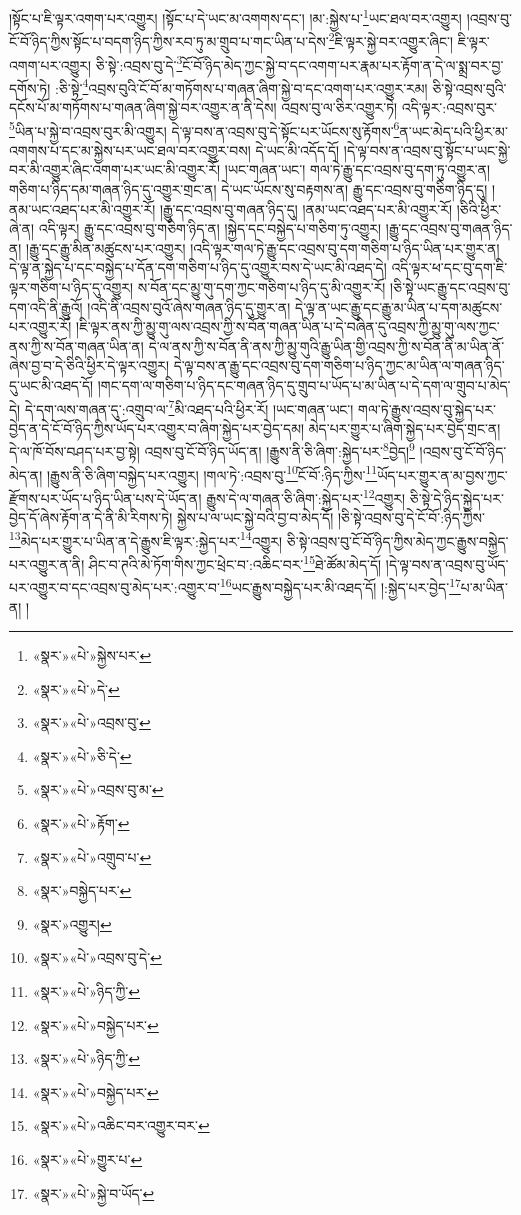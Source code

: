 །སྟོང་པ་ཇི་ལྟར་འགག་པར་འགྱུར། །སྟོང་པ་དེ་ཡང་མ་འགགས་དང་། །མ་:སྐྱེས་པ་\footnote{«སྣར་»«པེ་»སྐྱེས་པར་}ཡང་ཐལ་བར་འགྱུར། །འབྲས་བུ་ངོ་བོ་ཉིད་ཀྱིས་སྟོང་པ་བདག་ཉིད་ཀྱིས་རབ་ཏུ་མ་གྲུབ་པ་གང་ཡིན་པ་དེས་\footnote{«སྣར་»«པེ་»དེ་}ཇི་ལྟར་སྐྱེ་བར་འགྱུར་ཞིང་། ཇི་ལྟར་འགག་པར་འགྱུར། ཅི་སྟེ་:འབྲས་བུ་དེ་\footnote{«སྣར་»«པེ་»འབྲས་བུ་}ངོ་བོ་ཉིད་མེད་ཀྱང་སྐྱེ་བ་དང་འགག་པར་རྣམ་པར་རྟོག་ན་དེ་ལ་སྨྲ་བར་བྱ་དགོས་ཏེ། :ཅི་སྟེ་\footnote{«སྣར་»«པེ་»ཅི་དེ་}འབྲས་བུའི་ངོ་བོ་མ་གཏོགས་པ་གཞན་ཞིག་སྐྱེ་བ་དང་འགག་པར་འགྱུར་རམ། ཅི་སྟེ་འབྲས་བུའི་དངོས་པོ་མ་གཏོགས་པ་གཞན་ཞིག་སྐྱེ་བར་འགྱུར་ན་ནི་དེས། འབྲས་བུ་ལ་ཅིར་འགྱུར་ཏེ། འདི་ལྟར་:འབྲས་བུར་\footnote{«སྣར་»«པེ་»འབྲས་བུ་མ་}ཡིན་པ་སྐྱེ་བ་འབྲས་བུར་མི་འགྱུར། དེ་ལྟ་བས་ན་འབྲས་བུ་དེ་སྟོང་པར་ཡོངས་སུ་རྟོགས་\footnote{«སྣར་»«པེ་»རྟོག་}ན་ཡང་མེད་པའི་ཕྱིར་མ་འགགས་པ་དང་མ་སྐྱེས་པར་ཡང་ཐལ་བར་འགྱུར་བས། དེ་ཡང་མི་འདོད་དོ། །དེ་ལྟ་བས་ན་འབྲས་བུ་སྟོང་པ་ཡང་སྐྱེ་བར་མི་འགྱུར་ཞིང་འགག་པར་ཡང་མི་འགྱུར་རོ། །ཡང་གཞན་ཡང་། གལ་ཏེ་རྒྱུ་དང་འབྲས་བུ་དག་ཏུ་འགྱུར་ན། གཅིག་པ་ཉིད་དམ་གཞན་ཉིད་དུ་འགྱུར་གྲང་ན། དེ་ཡང་ཡོངས་སུ་བརྟགས་ན། རྒྱུ་དང་འབྲས་བུ་གཅིག་ཉིད་དུ། །ནམ་ཡང་འཐད་པར་མི་འགྱུར་རོ། །རྒྱུ་དང་འབྲས་བུ་གཞན་ཉིད་དུ། །ནམ་ཡང་འཐད་པར་མི་འགྱུར་རོ། །ཅིའི་ཕྱིར་ཞེ་ན། འདི་ལྟར། རྒྱུ་དང་འབྲས་བུ་གཅིག་ཉིད་ན། །སྐྱེད་དང་བསྐྱེད་པ་གཅིག་ཏུ་འགྱུར། །རྒྱུ་དང་འབྲས་བུ་གཞན་ཉིད་ན། །རྒྱུ་དང་རྒྱུ་མིན་མཚུངས་པར་འགྱུར། །འདི་ལྟར་གལ་ཏེ་རྒྱུ་དང་འབྲས་བུ་དག་གཅིག་པ་ཉིད་ཡིན་པར་གྱུར་ན། དེ་ལྟ་ན་སྐྱེད་པ་དང་བསྐྱེད་པ་དོན་དག་གཅིག་པ་ཉིད་དུ་འགྱུར་བས་དེ་ཡང་མི་འཐད་དེ། འདི་ལྟར་ཕ་དང་བུ་དག་ཇི་ལྟར་གཅིག་པ་ཉིད་དུ་འགྱུར། ས་བོན་དང་མྱུ་གུ་དག་ཀྱང་གཅིག་པ་ཉིད་དུ་མི་འགྱུར་རོ། །ཅི་སྟེ་ཡང་རྒྱུ་དང་འབྲས་བུ་དག་འདི་ནི་རྒྱུའོ། །འདི་ནི་འབྲས་བུའོ་ཞེས་གཞན་ཉིད་དུ་གྱུར་ན། དེ་ལྟ་ན་ཡང་རྒྱུ་དང་རྒྱུ་མ་ཡིན་པ་དག་མཚུངས་པར་འགྱུར་རོ། །ཇི་ལྟར་ནས་ཀྱི་མྱུ་གུ་ལས་འབྲས་ཀྱི་ས་བོན་གཞན་ཡིན་པ་དེ་བཞིན་དུ་འབྲས་ཀྱི་མྱུ་གུ་ལས་ཀྱང་ནས་ཀྱི་ས་བོན་གཞན་ཡིན་ན། དེ་ལ་ནས་ཀྱི་ས་བོན་ནི་ནས་ཀྱི་མྱུ་གུའི་རྒྱུ་ཡིན་གྱི་འབྲས་ཀྱི་ས་བོན་ནི་མ་ཡིན་ནོ་ཞེས་བྱ་བ་དེ་ཅིའི་ཕྱིར་དེ་ལྟར་འགྱུར། དེ་ལྟ་བས་ན་རྒྱུ་དང་འབྲས་བུ་དག་གཅིག་པ་ཉིད་ཀྱང་མ་ཡིན་ལ་གཞན་ཉིད་དུ་ཡང་མི་འཐད་དོ། །གང་དག་ལ་གཅིག་པ་ཉིད་དང་གཞན་ཉིད་དུ་གྲུབ་པ་ཡོད་པ་མ་ཡིན་པ་དེ་དག་ལ་གྲུབ་པ་མེད་དེ། དེ་དག་ལས་གཞན་དུ་:འགྲུབ་ལ་\footnote{«སྣར་»«པེ་»འགྲུབ་པ་}མི་འཐད་པའི་ཕྱིར་རོ། །ཡང་གཞན་ཡང་། གལ་ཏེ་རྒྱུས་འབྲས་བུ་སྐྱེད་པར་བྱེད་ན་དེ་ངོ་བོ་ཉིད་ཀྱིས་ཡོད་པར་འགྱུར་བ་ཞིག་སྐྱེད་པར་བྱེད་དམ། མེད་པར་གྱུར་པ་ཞིག་སྐྱེད་པར་བྱེད་གྲང་ན། དེ་ལ་ཁོ་བོས་བཤད་པར་བྱ་སྟེ། འབྲས་བུ་ངོ་བོ་ཉིད་ཡོད་ན། །རྒྱུས་ནི་ཅི་ཞིག་:སྐྱེད་པར་\footnote{«སྣར་»བསྐྱེད་པར་}བྱེད།\footnote{«སྣར་»འགྱུར།} །འབྲས་བུ་ངོ་བོ་ཉིད་མེད་ན། །རྒྱུས་ནི་ཅི་ཞིག་བསྐྱེད་པར་འགྱུར། །གལ་ཏེ་:འབྲས་བུ་\footnote{«སྣར་»«པེ་»འབྲས་བུ་དེ་}ངོ་བོ་:ཉིད་ཀྱིས་\footnote{«སྣར་»«པེ་»ཉིད་ཀྱི་}ཡོད་པར་གྱུར་ན་མ་བྱས་ཀྱང་རྫོགས་པར་ཡོད་པ་ཉིད་ཡིན་པས་དེ་ཡོད་ན། རྒྱུས་དེ་ལ་གཞན་ཅི་ཞིག་:སྐྱེད་པར་\footnote{«སྣར་»«པེ་»བསྐྱེད་པར་}འགྱུར། ཅི་སྟེ་དེ་ཉིད་སྐྱེད་པར་བྱེད་དོ་ཞེས་རྟོག་ན་དེ་ནི་མི་རིགས་ཏེ། སྐྱེས་པ་ལ་ཡང་སྐྱེ་བའི་བྱ་བ་མེད་དོ། །ཅི་སྟེ་འབྲས་བུ་དེ་ངོ་བོ་:ཉིད་ཀྱིས་\footnote{«སྣར་»«པེ་»ཉིད་ཀྱི་}མེད་པར་གྱུར་པ་ཡིན་ན་དེ་རྒྱུས་ཇི་ལྟར་:སྐྱེད་པར་\footnote{«སྣར་»«པེ་»བསྐྱེད་པར་}འགྱུར། ཅི་སྟེ་འབྲས་བུ་ངོ་བོ་ཉིད་ཀྱིས་མེད་ཀྱང་རྒྱུས་བསྐྱེད་པར་འགྱུར་ན་ནི། ཤིང་བ་ཊའི་མེ་ཏོག་གིས་ཀྱང་ཕྲེང་བ་:འཆིང་བར་\footnote{«སྣར་»«པེ་»འཆིང་བར་འགྱུར་བར་}ཐེ་ཚོམ་མེད་དོ། །དེ་ལྟ་བས་ན་འབྲས་བུ་ཡོད་པར་འགྱུར་བ་དང་འབྲས་བུ་མེད་པར་:འགྱུར་བ་\footnote{«སྣར་»«པེ་»གྱུར་པ་}ཡང་རྒྱུས་བསྐྱེད་པར་མི་འཐད་དོ། །:སྐྱེད་པར་བྱེད་\footnote{«སྣར་»«པེ་»སྐྱེ་བ་ཡོད་}པ་མ་ཡིན་ན། །
